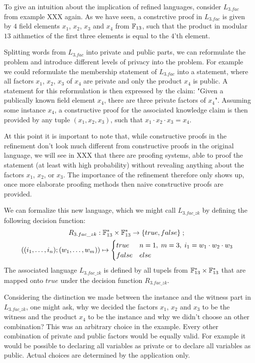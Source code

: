 \begin{example}[3-factorization] To give an intuition about the implication of refined languages, consider $L_{3.fac}$ from example XXX again. As we have seen, a constrctive proof in $L_{3.fac}$ is given by $4$ field elements $x_1$, $x_2$, $x_3$ and $x_4$ from $\mathbb{F}_{13}$, such that the product in modular $13$ aithmetics of the first three elements is equal to the $4$'th element. 

Splitting words from $L_{3.fac}$ into private and public parts, we can reformulate the problem and introduce different levels of privacy into the problem. For example we could reformulate the membership statement of $L_{3.fac}$ into a statement, where all factors $x_1$, $x_2$, $x_3$ of $x_4$ are private and only the product $x_4$ is public. A statement for this reformulation is then expressed by the claim: "Given a publically known field element $x_4$, there are three private factors of $x_4$". Assuming some instance $x_4$, a constructive proof for the associated knowledge claim is then provided by any tuple $(x_1,x_2,x_3)$, such that $x_1\cdot x_2\cdot x_3= x_4$. 

At this point it is important to note that, while constructive proofs in the refinement don't look much different from constructive proofs in the original language, we will see in XXX that there are proofing systems, able to proof the statement (at least with high probability) without revealing anything about the factors $x_1$, $x_2$, or $x_3$. The importance of the refinement therefore only shows up, once more elaborate proofing methods then naive constructive proofs are provided.

We can formalize this new language, which we might call $L_{3.fac\_zk}$ by defining the following decision function: 
\begin{multline*}
R_{3.fac\_zk} : \mathbb{F}_{13}^* \times \mathbb{F}_{13}^* \to \{true, false\}\;;\;\\
((i_1,\ldots,i_n);(w_1,\ldots, w_m)) \mapsto
\begin{cases}
true & n=1,\; m=3,\; i_1 = w_1\cdot w_2 \cdot w_3\\
false & else
\end{cases}
\end{multline*}
The associated language $L_{3.fac\_zk}$ is defined by all tupels from $\mathbb{F}_{13}^* \times \mathbb{F}_{13}^*$ that are mapped onto $true$ under the decision function $R_{3.fac\_zk}$. 

Considering the distinction we made between the instance and the witness part in $L_{3.fac\_zk}$, one might ask, why we decided the factors $x_1$, $x_2$ and $x_3$ to be the witness and the product $x_4$ to be the instance and why we didn't choose an other combination? This was an arbitrary choice in the example. Every other combination of private and public factors would be equally valid. For example it would be possible to declaring all variables as private or to declare all variables as public. Actual choices are determined by the application only.
\end{example}
